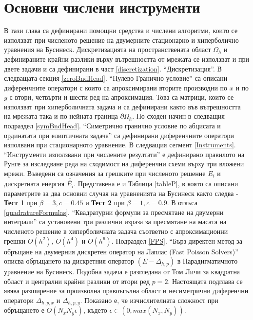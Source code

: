 \documentclass[a4paper]{article}
\theoremstyle{remark}
\begin{document}
\section{Основни числени инструменти}\label{numaBasic}
В тази глава са дефинирани помощни средства и числени алгоритми, които се използват при численото решение на двумерните стационарно и хиперболично уравнения на Бусинеск. Дискретизацията на пространствената област $\Omega_h$ и дефинираните крайни разлики върху вътрешността от мрежата се използват и при двете задачи и са дефинирани в част \ref{discretization}. ``Дискретизация''. В следващата секция \ref{zeroBndHead}. ``Нулево Гранично условие'' са описани диференчните оператори с които са апроксимирани вторите производни по $x$ и по $y$ с втори, четвърти и шести ред на апроксимация. Това са матрици, които се използват при хиперболичната задача и са дефинирани както във вътрешността на мрежата така и по нейната граница $\partial \Omega_h$. По сходен начин в следващия подраздел \ref{symBndHead}. ``Симетрично гранично условие по абцисата и ординатата при елиптичната задача'' са дефинирани диференчните оператори изполвани при стационарното уравнение. В следващия сегмент \ref{Instruments}. ``Инструменти използвани при числените резултати'' е дефинирано правилото на Рунге за изследване реда на сходимост на диференчни схеми върху три вложени мрежи. Въведени са означения за грешките при численото решение $\bar{ E_i}$ и дискретната енергия $\bar{\bar{ E_i}}$. Представена е и Таблица \ref{tableP}, в която са описани параметрите за два основни случая на уравненията на Бусинеск както следва - \textbf{Тест 1} при $\beta = 3, c=0.45$ и \textbf{Тест 2} при $\beta = 1, c=0.9$. В откъса \ref{quadratureFormulas}. ``Квадратурни формули за пресмятане на двумерни интеграли'' са установени три различни израза за пресмятане на масата на численото решение в хиперболичната задача съответно с апроксимационни грешки $O(h^2)$, $O(h^4)$ и $O(h^6)$.  Подраздел \ref{FPS}. ``Бърз директен метод за обръщане на двумерния дискретен оператор на Лаплас (Fast Poisson Solvers)'' описва обръщането на дискретния оператор $(E-\Delta_{h,p})$ в Парадигматичното уравнение на Бусинеск. Подобна задача е разгледана от Том Личи за квадратна област и централни крайни разлики от втори ред $p=2$. Настоящата подглава се явява разширение за произволна правоъгълна област и несиметрични диференчни оператори $\Delta_{h,p,x}$ и $\Delta_{h,p,y}$. Показано е, че изчислителната сложност при обръщането е $O(N_x N_y \bar{\epsilon})$, където $\bar{\epsilon} \in (0, max(N_x, N_y))$.
\end{document}
